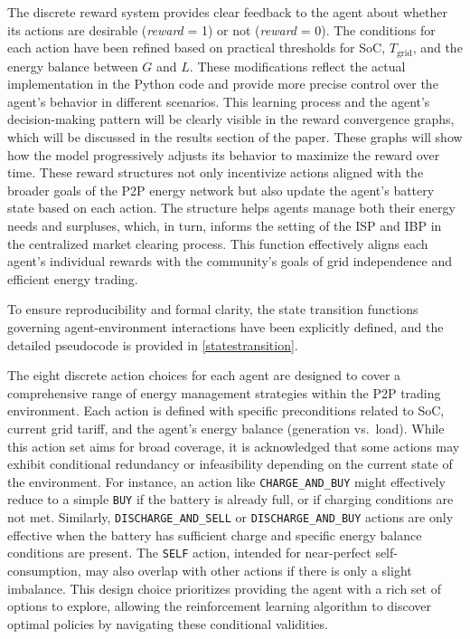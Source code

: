 \documentclass[preprint,12pt]{elsarticle}
\begin{document}
The discrete reward system provides clear feedback to the agent about whether its actions are desirable (\textit{reward} = 1) or not (\textit{reward} = 0). The conditions for each action have been refined based on practical thresholds for SoC, $T_\mathrm{grid}$, and the energy balance between $G$ and $L$. These modifications reflect the actual implementation in the Python code and provide more precise control over the agent’s behavior in different scenarios. This learning process and the agent’s decision-making pattern will be clearly visible in the reward convergence graphs, which will be discussed in the results section of the paper. These graphs will show how the model progressively adjusts its behavior to maximize the reward over time. These reward structures not only incentivize actions aligned with the broader goals of the P2P energy network but also update the agent’s battery state based on each action. The structure helps agents manage both their energy needs and surpluses, which, in turn, informs the setting of the ISP and IBP in the centralized market clearing process. This function effectively aligns each agent’s individual rewards with the community’s goals of grid independence and efficient energy trading. 

To ensure reproducibility and formal clarity, the state transition functions governing agent-environment interactions have been explicitly defined, and the detailed pseudocode is provided in \ref{statestransition}.

The eight discrete action choices for each agent are designed to cover a comprehensive range of energy management strategies within the P2P trading environment. Each action is defined with specific preconditions related to SoC, current grid tariff, and the agent's energy balance (generation vs.\ load). While this action set aims for broad coverage, it is acknowledged that some actions may exhibit conditional redundancy or infeasibility depending on the current state of the environment. For instance, an action like \texttt{CHARGE\_AND\_BUY} might effectively reduce to a simple \texttt{BUY} if the battery is already full, or if charging conditions are not met. Similarly, \texttt{DISCHARGE\_AND\_SELL} or \texttt{DISCHARGE\_AND\_BUY} actions are only effective when the battery has sufficient charge and specific energy balance conditions are present. The \texttt{SELF} action, intended for near-perfect self-consumption, may also overlap with other actions if there is only a slight imbalance. This design choice prioritizes providing the agent with a rich set of options to explore, allowing the reinforcement learning algorithm to discover optimal policies by navigating these conditional validities.
\end{document}
